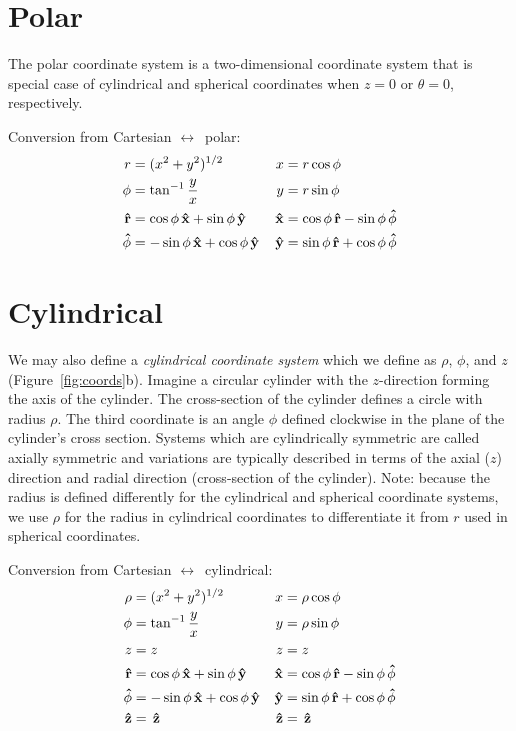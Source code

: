 \section{Polar}
The polar coordinate system is a two-dimensional coordinate system that is
special case of cylindrical and spherical coordinates when $z = 0$ or $\theta =
0$, respectively.

Conversion from Cartesian $\leftrightarrow$\ polar:
\begin{align*}
    r &= (x^2 + y^2)^{1/2} & x &= r \cos \phi \\
    \phi &= \tan^{-1} \frac{y}{x} & y &= r \sin \phi \\
    \vu{r} &= \cos \phi \,\vu{x} + \sin \phi \,\vu{y} &
    \,\vu{x} &= \cos \phi \,\vu{r} - \sin \phi \,\vu{\phi} \\
    \vu{\phi} &= -\sin \phi \,\vu{x} + \cos \phi \,\vu{y} &
    \,\vu{y} &= \sin \phi \,\vu{r} + \cos \phi \,\vu{\phi} \\
\end{align*}

\section{Cylindrical}
We may also define a {\it cylindrical coordinate system} which we define as $\rho$, $\phi$, and $z$ (Figure~\ref{fig:coords}b).  Imagine a circular cylinder with the $z$-direction forming the axis of the cylinder.  The cross-section of the cylinder defines a circle with radius $\rho$.  The third coordinate is an angle $\phi$ defined clockwise in the plane of the cylinder's cross section.  Systems which are cylindrically symmetric are called axially symmetric and variations are typically described in terms of the axial ($z$) direction and radial direction (cross-section of the cylinder).  Note: because the radius is defined differently for the cylindrical and spherical coordinate systems, we use $\rho$ for the radius in cylindrical coordinates to differentiate it from $r$ used in spherical coordinates.

Conversion from Cartesian $\leftrightarrow$\ cylindrical:
\begin{align*}
    \rho &= (x^2 + y^2)^{1/2} & x &= \rho \cos \phi \\
    \phi &= \tan^{-1} \frac{y}{x} & y &= \rho \sin \phi \\
    z &= z & z &= z \\
    \vu{r} &= \cos \phi \,\vu{x} + \sin \phi \,\vu{y} &
    \vu{x} &= \cos \phi \,\vu{r} - \sin \phi \,\vu{\phi} \\
    \vu{\phi} &= -\sin \phi \,\vu{x} + \cos \phi \,\vu{y} &
    \vu{y} &= \sin \phi \,\vu{r} + \cos \phi \,\vu{\phi} \\
    \vu{z} &= \,\vu{z} & \,\vu{z} &= \,\vu{z}
\end{align*}

